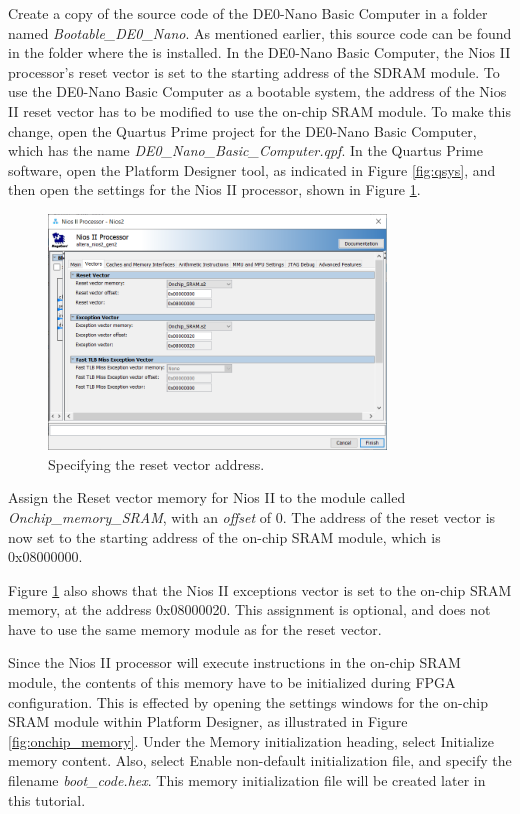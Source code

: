 \documentclass[11pt, twoside, pdftex]{article}
\begin{document}
Create a copy of the source code of the DE0-Nano Basic Computer in a
folder named {\it Bootable\_DE0\_Nano}.  As mentioned earlier, this source code can
be found in the folder where the \productNameMed{} is installed.
In the DE0-Nano Basic Computer, the Nios II processor's 
reset vector is set to the starting address of the SDRAM module. To use the
DE0-Nano Basic Computer as a bootable system, the address of the Nios II reset vector 
has to be modified to use the on-chip SRAM module. To make this change, open the
Quartus Prime project for the DE0-Nano Basic Computer, which has the name 
{\it DE0\_Nano\_Basic\_Computer.qpf}. In the Quartus Prime software, open the Platform Designer
tool, as indicated in Figure \ref{fig:qsys}, and then open the settings for the Nios II 
processor, shown in Figure \ref{fig:reset_vector}.

\newpage
\begin{figure}[H]
   \begin{center}
        \includegraphics[width=0.8\textwidth]{figures/reset_vector.png}
   \end{center}
   \caption{Specifying the reset vector address.}
	\label{fig:reset_vector}
\end{figure}

Assign the {\sf Reset vector memory} for Nios II to
the module called {\it Onchip\_memory\_SRAM}, with an {\it offset} of 0. The address of
the reset vector is now set to the starting address of the on-chip SRAM module, 
which is {\sf 0x08000000}.

Figure \ref{fig:reset_vector} also shows that the Nios II exceptions vector is set to
the on-chip SRAM memory, at the address {\sf 0x08000020}.  This assignment is optional,
and does not have to use the same memory module as for the reset vector.

Since the Nios II processor will execute instructions in the on-chip SRAM module, the
contents of this memory have to be initialized during FPGA configuration. This is effected by
opening the settings windows for the on-chip SRAM module within Platform Designer, as illustrated in 
Figure \ref{fig:onchip_memory}. Under the {\sf Memory initialization} heading, 
select {\sf Initialize memory content}. Also, select {\sf Enable non-default
initialization file}, and specify the filename {\it boot\_code.hex}. This memory
initialization file will be created later in this tutorial.
\end{document}
